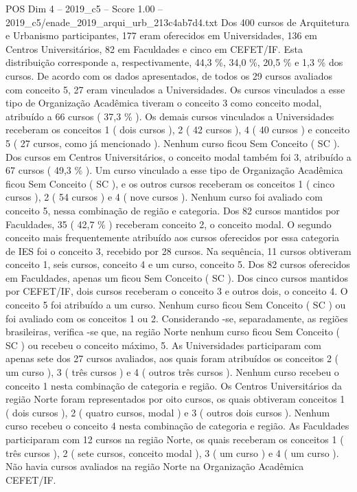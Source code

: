 \begin{textsample}{POS Dim 4 – 2019\_c5 – Score 1.00 – 2019\_c5/enade\_2019\_arqui\_urb\_213c4ab7d4.txt}
Dos 400 cursos de Arquitetura e Urbanismo participantes, 177 eram oferecidos em Universidades, 136 em Centros Universitários, 82 em Faculdades e cinco em CEFET/IF.
Esta distribuição corresponde a, respectivamente, 44,3 \%, 34,0 \%, 20,5 \% e 1,3 \% dos cursos.
De acordo com os dados apresentados, de todos os 29 cursos avaliados com conceito 5, 27 eram vinculados a Universidades.
Os cursos vinculados a esse tipo de Organização Acadêmica tiveram o conceito 3 como conceito modal, atribuído a 66 cursos ( 37,3 \% ).
Os demais cursos vinculados a Universidades receberam os conceitos 1 ( dois cursos ), 2 ( 42 cursos ), 4 ( 40 cursos ) e conceito 5 ( 27 cursos, como já mencionado ).
Nenhum curso ficou Sem Conceito ( SC ).
Dos cursos em Centros Universitários, o conceito modal também foi 3, atribuído a 67 cursos ( 49,3 \% ).
Um curso vinculado a esse tipo de Organização Acadêmica ficou Sem Conceito ( SC ), e os outros cursos receberam os conceitos 1 ( cinco cursos ), 2 ( 54 cursos ) e 4 ( nove cursos ).
Nenhum curso foi avaliado com conceito 5, nessa combinação de região e categoria.
Dos 82 cursos mantidos por Faculdades, 35 ( 42,7 \% ) receberam conceito 2, o conceito modal.
O segundo conceito mais frequentemente atribuído aos cursos oferecidos por essa categoria de IES foi o conceito 3, recebido por 28 cursos.
Na sequência, 11 cursos obtiveram conceito 1, seis cursos, conceito 4 e um curso, conceito 5.
Dos 82 cursos oferecidos em Faculdades, apenas um ficou Sem Conceito ( SC ).
Dos cinco cursos mantidos por CEFET/IF, dois cursos receberam o conceito 3 e outros dois, o conceito 4.
O conceito 5 foi atribuído a um curso.
Nenhum curso ficou Sem Conceito ( SC ) ou foi avaliado com os conceitos 1 ou 2.
Considerando -se, separadamente, as regiões brasileiras, verifica -se que, na região Norte nenhum curso ficou Sem Conceito ( SC ) ou recebeu o conceito máximo, 5.
As Universidades participaram com apenas sete dos 27 cursos avaliados, aos quais foram atribuídos os conceitos 2 ( um curso ), 3 ( três cursos ) e 4 ( outros três cursos ).
Nenhum curso recebeu o conceito 1 nesta combinação de categoria e região.
Os Centros Universitários da região Norte foram representados por oito cursos, os quais obtiveram conceitos 1 ( dois cursos ), 2 ( quatro cursos, modal ) e 3 ( outros dois cursos ).
Nenhum curso recebeu o conceito 4 nesta combinação de categoria e região.
As Faculdades participaram com 12 cursos na região Norte, os quais receberam os conceitos 1 ( três cursos ), 2 ( sete cursos, conceito modal ), 3 ( um curso ) e 4 ( um curso ).
Não havia cursos avaliados na região Norte na Organização Acadêmica CEFET/IF.

\end{textsample}
